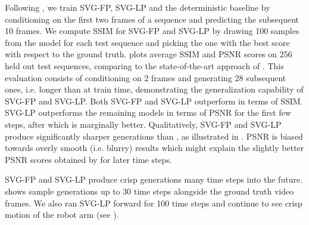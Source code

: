 Following \citet{Babaeizadeh1017}, we train SVG-FP, SVG-LP and the deterministic baseline by conditioning on the first two frames of a sequence and predicting the subsequent 10 frames. 
We compute SSIM for SVG-FP and SVG-LP by drawing 100 samples from the model for each test sequence and picking the one with the best score with respect to the ground truth. 
 plots average SSIM and PSNR scores on 256 held out
test sequences, comparing to the state-of-the-art approach of \citet{Babaeizadeh1017}.  
This evaluation consists of conditioning on 2 frames and generating 28
subsequent ones, i.e. longer than at train time,  demonstrating the generalization capability of SVG-FP and SVG-LP. 
Both SVG-FP and SVG-LP outperform \citet{Babaeizadeh1017} in terms of SSIM.
SVG-LP outperforms the remaining models in terms of PSNR for the first few steps, after which  \citet{Babaeizadeh1017} is marginally better. 
Qualitatively, SVG-FP and SVG-LP produce significantly sharper generations than \citet{Babaeizadeh1017}, as illustrated in .
PSNR is biased towards overly smooth (i.e. blurry) results which might explain the slightly better PSNR scores obtained by \citet{Babaeizadeh1017} for later time steps. 

SVG-FP and SVG-LP produce crisp generations many time steps into the future.  shows sample generations up to 30 time steps alongside the ground truth video frames.
We also ran SVG-LP forward for 100 time steps and continue to see
crisp motion of the robot arm (see ).



